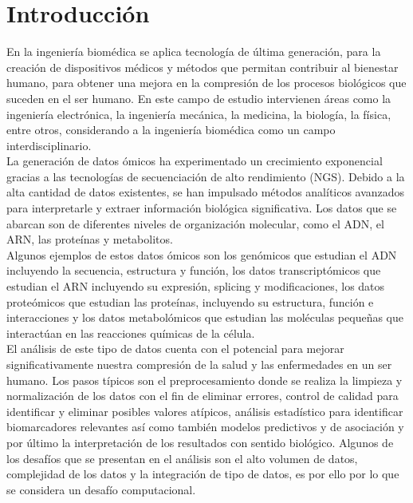 \section{Introducción}

En la ingeniería biomédica se aplica tecnología de última generación, para la creación de dispositivos médicos y métodos que permitan contribuir al bienestar humano, para obtener una mejora en la compresión de los procesos biológicos que suceden en el ser humano. En este campo de estudio intervienen áreas como la ingeniería electrónica, la ingeniería mecánica, la medicina, la biología, la física, entre otros, considerando a la ingeniería biomédica como un campo interdisciplinario.\\

La generación de datos ómicos ha experimentado un crecimiento exponencial gracias a las tecnologías de secuenciación de alto rendimiento (NGS). Debido a la alta cantidad de datos existentes, se han impulsado métodos analíticos avanzados para interpretarle y extraer información biológica significativa. Los datos que se abarcan son de diferentes niveles de organización molecular, como el ADN, el ARN, las proteínas y metabolitos.\\ 

 Algunos ejemplos de estos datos ómicos son los genómicos que estudian el ADN incluyendo la secuencia, estructura y función, los datos transcriptómicos que estudian el ARN incluyendo su expresión, splicing y modificaciones, los datos proteómicos que estudian las proteínas, incluyendo su estructura, función e interacciones y los datos metabolómicos que estudian las moléculas pequeñas que interactúan en las reacciones químicas de la célula. \\

El análisis de este tipo de datos cuenta con el potencial para mejorar significativamente nuestra compresión de la salud y las enfermedades en un ser humano. Los pasos típicos son el preprocesamiento donde se realiza la limpieza y normalización de los datos con el fin de eliminar errores, control de calidad para identificar y eliminar posibles valores atípicos, análisis estadístico para identificar biomarcadores relevantes así como también modelos predictivos y de asociación y por último la interpretación de los resultados con sentido biológico.
Algunos de los desafíos que se presentan en el análisis son el alto volumen de datos, complejidad de los datos y la integración de tipo de datos, es por ello por lo que se considera un desafío computacional.\\ 

